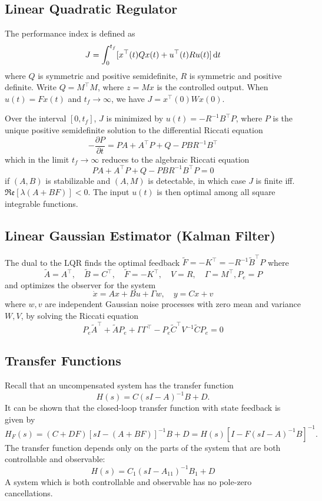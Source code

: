 \documentclass{report}
\begin{document}
\subsection{Linear Quadratic Regulator}
The performance index is defined as
$$
J = \int_0^{t_f} [x^\top(t) Q x(t) + u^\top (t) R u(t)] \dif t
$$
where $Q$ is symmetric and positive semidefinite, $R$ is symmetric
and positive definite. Write $Q = M^\top M$, where $z = M x$ is the
controlled output. When $u(t) = F x(t)$ and $t_f \to \infty$, we have
$J = x^\top(0) W x(0)$.

Over the interval $[0, t_f]$, $J$ is minimized by
$u(t) = -R^{-1} B^\top P$, where $P$ is the unique
positive semidefinite solution to the
differential Riccati equation
$$
-\frac{\partial P}{\partial t} =
P A + A^\top P + Q - P B R^{-1} B^\top
$$
which in the limit $t_f \to \infty$ reduces to the algebraic Riccati
equation
$$
P A + A^\top P + Q - P B R^{-1} B^\top P = 0
$$
if $(A, B)$ is stabilizable and $(A, M)$ is detectable, in which case
$J$ is finite iff. $\mathfrak{Re}[\lambda(A + BF)] < 0$. The input
$u(t)$ is then optimal among all square integrable functions.

\subsection{Linear Gaussian Estimator (Kalman Filter)}
The dual to the LQR finds the optimal feedback
$\tilde{F} =- K^\top = -R^{-1} \tilde{B}^\top P$ where
$$
\tilde{A} = A^\top, \quad
\tilde{B} = C^\top, \quad
\tilde{F} = -K^\top, \quad
V = R, \quad
\Gamma = M^\top,
P_e = P
$$
and optimizes the observer for the system
$$
\dot{x} = A x + B u + \Gamma w, \quad
y = C x + v
$$
where $w, v$ are independent Gaussian noise processes with zero mean
and variance $W, V$, by solving the Riccati equation
$$
  P_e \tilde{A}^\top
+ \tilde{A} P_e
+ \Gamma \Gamma^\top
- P_e \tilde{C}^\top V^{-1} \tilde{C} P_e
= 0
$$

\subsection{Transfer Functions}
Recall that an uncompensated system has the transfer function
$$
H(s) = C(sI - A)^{-1} B + D.
$$
It can be shown that the closed-loop transfer function with state
feedback is given by
$$
H_F(s) = (C + DF)[sI - (A + BF)]^{-1} B + D = H(s)[I - F(sI - A)^{-1} B]^{-1}.
$$
The transfer function depends only on the parts of the system that are
both controllable and observable:
$$
H(s) = C_1 (sI - A_{11})^{-1} B_1 + D
$$
A system which is both controllable and observable has no pole-zero cancellations.
\end{document}

